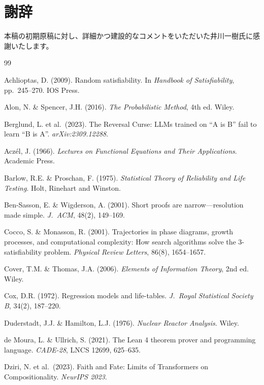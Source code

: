 \documentclass[11pt,a4paper]{article}
\begin{document}
\section*{謝辞}
本稿の初期原稿に対し、詳細かつ建設的なコメントをいただいた井川一樹氏に感謝いたします。

\begin{thebibliography}{99}

Achlioptas, D. (2009).
Random satisfiability.
In \emph{Handbook of Satisfiability}, pp.~245--270. IOS Press.

Alon, N. \& Spencer, J.H. (2016).
\emph{The Probabilistic Method}, 4th ed.
Wiley.

Berglund, L. et al.\ (2023).
The Reversal Curse: LLMs trained on ``A is B'' fail to learn ``B is A''.
\emph{arXiv:2309.12288}.

Acz\'{e}l, J. (1966).
\emph{Lectures on Functional Equations and Their Applications}.
Academic Press.

Barlow, R.E. \& Proschan, F. (1975).
\emph{Statistical Theory of Reliability and Life Testing}.
Holt, Rinehart and Winston.

Ben-Sasson, E. \& Wigderson, A. (2001).
Short proofs are narrow---resolution made simple.
\emph{J.\ ACM}, 48(2), 149--169.

Cocco, S. \& Monasson, R. (2001).
Trajectories in phase diagrams, growth processes, and computational complexity: How search algorithms solve the 3-satisfiability problem.
\emph{Physical Review Letters}, 86(8), 1654--1657.

Cover, T.M. \& Thomas, J.A. (2006).
\emph{Elements of Information Theory}, 2nd ed.
Wiley.

Cox, D.R. (1972).
Regression models and life-tables.
\emph{J.\ Royal Statistical Society B}, 34(2), 187--220.

Duderstadt, J.J. \& Hamilton, L.J. (1976).
\emph{Nuclear Reactor Analysis}.
Wiley.

de Moura, L. \& Ullrich, S. (2021).
The Lean 4 theorem prover and programming language.
\emph{CADE-28}, LNCS 12699, 625--635.

Dziri, N. et al.\ (2023).
Faith and Fate: Limits of Transformers on Compositionality.
\emph{NeurIPS 2023}.


\end{thebibliography}
\end{document}
